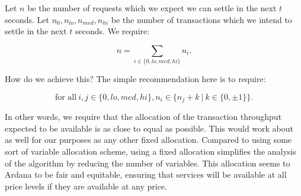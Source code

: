 \documentclass[12pt]{article}
\begin{document}
Let $n$ be the number of requests which we expect we can settle in the next $t$ seconds. Let $n_0, n_{lo}, n_{med}, n_{hi}$ be the number of transactions which we intend to settle in the next $t$ seconds. We require:

\begin{equation}
	n = \sum_{i \in \{0, lo, med, hi\}} n_i.
\end{equation}

How do we achieve this? The simple recommendation here is to require:

\begin{equation}
	\text{for all}\ i, j \in \{0, lo, med, hi\}, n_i \in \{n_j + k\ |\ k \in \{0, \pm 1\}\}.
\end{equation}

In other words, we require that the allocation of the transaction throughput expected to be available is as close to equal as possible. This would work about as well for our purposes as any other fixed allocation. Compared to using some sort of variable allocation scheme, using a fixed allocation simplifies the analysis of the algorithm by reducing the number of variables. This allocation seems to Ardana to be fair and equitable, ensuring that services will be available at all price levels if they are available at any price.
\end{document}
